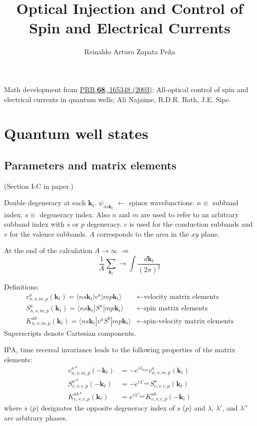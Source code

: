 \documentclass{article}
\title{Optical Injection and Control of Spin and Electrical Currents}
\author{Reinaldo Arturo Zapata Pe\~na}
\date{}
\newcommand{\kt}{\mathbf{k}_{t}}
\begin{document}
\maketitle

Math development from
\href{http://journals.aps.org/prb/abstract/10.1103/PhysRevB.68.165348}{PRB
\textbf{68}, 165348 (2003)}: All-optical control of spin and electrical currents
in quantum wells; Ali Najaime, R.D.R. Bath, J.E. Sipe.


\section{Quantum well states} %
\label{sec:quantum_well_states}

\subsection{Parameters and matrix elements}
{\small (Section I-C in paper.) \\}

Double degeneracy at each $\kt$. $\psi_{ns\kt}$ $\leftarrow$ spinor
wavefunctions: $n \equiv$ subband index; $s\equiv$ degeneracy index. Also $n$
and $m$ are used to refer to an arbitrary subband index with $s$ or $p$
degeneracy. $c$ is used for the conduction subbands and $v$ for the valence
subbands. $A$ corresponds to the area in the $xy$ plane.

At the end of the calculation $A \rightarrow \infty$ $\Rightarrow$
\begin{equation*}
\frac{1}{A} \sum_{\kt} \rightarrow \int \frac{d\kt}{(2 \pi)^{2}} 
\end{equation*}

Definitions:
\begin{align*}
v_{n,s;m,p}^{a}(\kt) = \langle ns\kt | v^{a} |
mp\kt \rangle & \leftarrow \text{velocity matrix elements}\\
S_{n,s;m,p}^{a}(\kt) = \langle ns\kt | S^{a} |
mp\kt \rangle & \leftarrow \text{spin matrix elements}\\
K_{n,s;m,p}^{ab}(\kt)= \langle ns\kt | v^{a}S^{b} |
mp\kt \rangle & \leftarrow \text{spin-velocity matrix elements}
\end{align*}
Superscripts denote Cartesian components.

IPA, time recersal invariance leads to the following properties of the matrix
elements:
\begin{align*}
v_{n,\overline{s};m,\overline{p}}^{a*}(-\kt) &=
 -e^{i \lambda_{nm}} v_{n,s;m,p}^{a}(\kt)\\
S_{c,\overline{s};c,\overline{p}}^{a*}(-\kt) &=
 -e^{i \lambda'_{nm}} S_{c,s;c,p}^{a}(\kt)\\
K_{c,s;c,p}^{ab*}(\kt)&= 
 e^{i \lambda''_{nm}} K_{c,\overline{s};c,\overline{p}}^{ab}(-\kt)
\end{align*}
where $\overline{s}$ ($\overline{p}$) designates the opposite degeneracy index
of $s$ ($p$) and $\lambda$, $\lambda'$, and $\lambda''$ are arbitrary phases.
\end{document}
